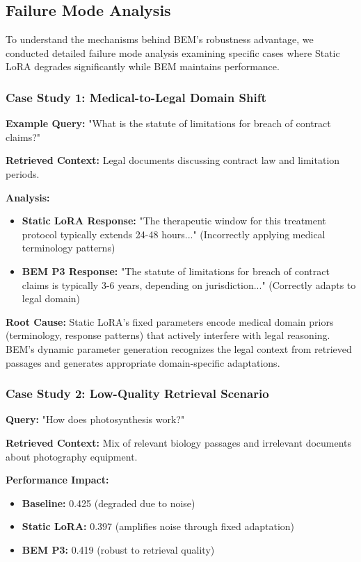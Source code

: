 \subsection{Failure Mode Analysis}

To understand the mechanisms behind BEM's robustness advantage, we conducted detailed failure mode analysis examining specific cases where Static LoRA degrades significantly while BEM maintains performance.

\subsubsection{Case Study 1: Medical-to-Legal Domain Shift}

\textbf{Example Query:} "What is the statute of limitations for breach of contract claims?"

\textbf{Retrieved Context:} Legal documents discussing contract law and limitation periods.

\textbf{Analysis:}
\begin{itemize}
    \item \textbf{Static LoRA Response:} "The therapeutic window for this treatment protocol typically extends 24-48 hours..." (Incorrectly applying medical terminology patterns)
    \item \textbf{BEM P3 Response:} "The statute of limitations for breach of contract claims is typically 3-6 years, depending on jurisdiction..." (Correctly adapts to legal domain)
\end{itemize}

\textbf{Root Cause:} Static LoRA's fixed parameters encode medical domain priors (terminology, response patterns) that actively interfere with legal reasoning. BEM's dynamic parameter generation recognizes the legal context from retrieved passages and generates appropriate domain-specific adaptations.

\subsubsection{Case Study 2: Low-Quality Retrieval Scenario}

\textbf{Query:} "How does photosynthesis work?"

\textbf{Retrieved Context:} Mix of relevant biology passages and irrelevant documents about photography equipment.

\textbf{Performance Impact:}
\begin{itemize}
    \item \textbf{Baseline:} 0.425 (degraded due to noise)
    \item \textbf{Static LoRA:} 0.397 (amplifies noise through fixed adaptation)
    \item \textbf{BEM P3:} 0.419 (robust to retrieval quality)
\end{itemize}

